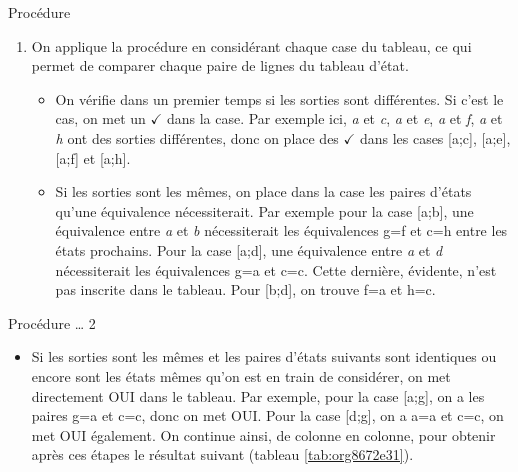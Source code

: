 \documentclass[presentation]{beamer}
\begin{document}
\begin{frame}[label={sec:org70cbf46}]{Procédure}
\begin{enumerate}
\item On applique la procédure en considérant chaque case du tableau, ce
qui permet de comparer chaque paire de lignes du tableau d'état.

\begin{itemize}
\item On vérifie dans un premier temps si les sorties sont
différentes. Si c'est le cas, on met un \(\checkmark\) dans la
case. Par exemple ici, \emph{a} et \emph{c}, \emph{a} et \emph{e}, \emph{a} et \emph{f}, \emph{a} et
\emph{h} ont des sorties différentes, donc on place des \(\checkmark\)
dans les cases [a;c], [a;e], [a;f] et [a;h].
\item Si les sorties sont les mêmes, on place dans la case les paires
d'états qu'une équivalence nécessiterait. Par exemple pour la
case [a;b], une équivalence entre \emph{a} et \emph{b} nécessiterait les
équivalences g=f et c=h entre les états prochains. Pour la case
[a;d], une équivalence entre \emph{a} et \emph{d} nécessiterait les
équivalences g=a et c=c. Cette dernière, évidente, n'est pas
inscrite dans le tableau. Pour [b;d], on trouve f=a et h=c.
\end{itemize}
\end{enumerate}
\end{frame}

\begin{frame}[label={sec:org1d91e2a}]{Procédure \ldots{} 2}
\begin{itemize}
\item Si les sorties sont les mêmes et les paires d'états suivants sont
identiques ou encore sont les états mêmes qu'on est en train de
considérer, on met directement OUI dans le tableau. Par exemple,
pour la case [a;g], on a les paires g=a et c=c, donc on met
OUI. Pour la case [d;g], on a a=a et c=c, on met OUI
également. On continue ainsi, de colonne en colonne, pour obtenir
après ces étapes le résultat suivant (tableau \ref{tab:org8672e31}).
\end{itemize}
\end{frame}
\end{document}
